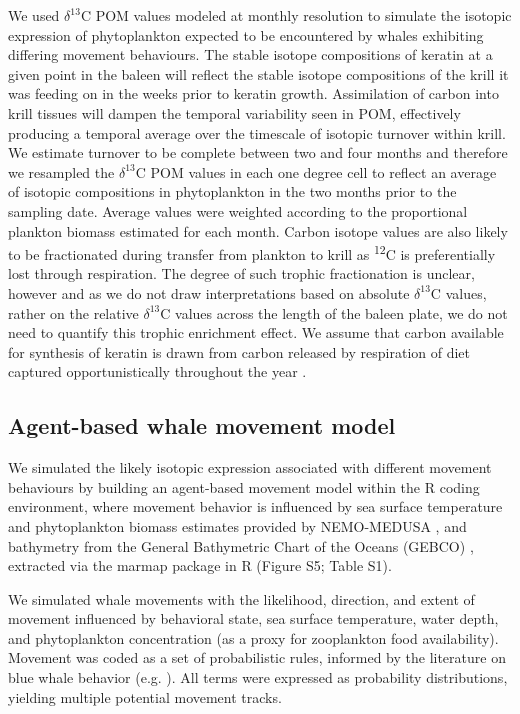 \documentclass[a4paper,12pt]{article}
\begin{document}
We used \(\delta^{13}\)C POM values modeled at monthly resolution to simulate the isotopic expression of phytoplankton expected to be encountered by whales exhibiting differing movement behaviours. 
The stable isotope compositions of keratin at a given point in the baleen will reflect the stable isotope compositions of the krill it was feeding on in the weeks prior to keratin growth. 
Assimilation of carbon into krill tissues will dampen the temporal variability seen in POM, effectively producing a temporal average over the timescale of isotopic turnover within krill. 
We estimate turnover to be complete between two and four months and therefore we resampled the \(\delta^{13}\)C POM values in each one degree cell to reflect an average of isotopic compositions in phytoplankton in the two months prior to the sampling date. 
Average values were weighted according to the proportional plankton biomass estimated for each month. 
Carbon isotope values are also likely to be fractionated during transfer from plankton to krill as \textsuperscript{12}C is preferentially lost through respiration. 
The degree of such trophic fractionation is unclear, however and as we do not draw interpretations based on absolute \(\delta^{13}\)C values, rather on the relative \(\delta^{13}\)C values across the length of the baleen plate, we do not need to quantify this trophic enrichment effect. 
We assume that carbon available for synthesis of keratin is drawn from carbon released by respiration of diet captured opportunistically throughout the year \citep{baines2017autumn,silva2013north,visser2011timing,busquets2017estimating, lesage2017foraging, bailey2009behavioural, branch2007, huckgaete2018}.

\subsection{Agent-based whale movement model}
\label{agent-based-whale-movement-model}

We simulated the likely isotopic expression associated with different movement behaviours by building an agent-based movement model within the R coding environment, where movement behavior is influenced by sea surface temperature and phytoplankton biomass estimates provided by NEMO-MEDUSA \citep{yool2013medusa}, and bathymetry from the General Bathymetric Chart of the Oceans (GEBCO) \citep{bathy}, extracted via the marmap package in R \citep{marmap} (Figure S5; Table S1).

We simulated whale movements with the likelihood, direction, and extent of movement influenced by behavioral state, sea surface temperature, water depth, and phytoplankton concentration (as a proxy for zooplankton food availability).
Movement was coded as a set of probabilistic rules, informed by the literature on blue whale behavior (e.g. \citep{handbook}).
All terms were expressed as probability distributions, yielding multiple potential movement tracks.
\end{document}
